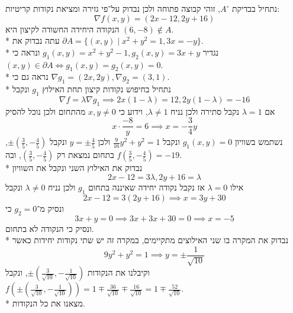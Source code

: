 נתחיל בבדיקת $A^\circ$, זוהי קבוצה פתוחה ולכן נבדוק על־פי גזירה ומציאת נקודות קריטיות:
\[
	\nabla f(x, y) = (2x - 12, 2y + 16)
\]
הנקודה היחידה החשודה לקיצון היא $(6, -8) \notin A$. \\*
עתה נבדוק את $\partial A = \{(x, y) \mid x^2 + y^2 = 1, 3x = -y \}$. \\*
נגדיר $g_1(x, y) = x^2 + y^2 - 1, g_2(x, y) = 3x + y$ ונראה כי $(x, y) \in \partial A \iff g_1(x, y) = g_2(x, y) = 0$. \\*
נראה גם כי $\nabla g_1 = (2x, 2y), \nabla g_2 = (3, 1)$. \\*
נתחיל בחיפוש נקודות קיצון תחת האילוץ $g_1$ ונקבל
\[
	\nabla f = \lambda \nabla g_1
	\implies
	2x (1 - \lambda) = 12, 2y (1 - \lambda) = -16
\]
אם $\lambda = 1$ נקבל סתירה ולכן נניח $\lambda \ne 1$, וידוע כי $x, y \ne 0$ מהתחום ולכן נוכל להסיק
\[
	x \cdot \frac{-8}{y} = 6 \implies x = -\frac{3}{4} y
\]
נשתמש בשוויון $g_1(x, y) = 0$ ונקבל $\frac{9}{16}y^2 + y^2 = 1$ ולכן $y = \pm \frac{4}{5}$ ונקבל $\pm(\frac{3}{5}, -\frac{4}{5})$, בתחום נמצאת רק $(\frac{3}{5}, -\frac{4}{5})$, ובה $f(\frac{3}{5}, -\frac{4}{5}) = -19$. \\*
נבדוק את האילוץ השני ונקבל את השוויון
\[
	2x - 12 = 3 \lambda, 2y + 16 = \lambda
\]
אילו $\lambda = 0$ אז נקבל נקודה יחידה שאיננה בתחום $g_1$ ולכן נניח $\lambda \ne 0$ ונקבל
\[
	2x - 12 = 3(2y + 16) \implies x = 3y + 30
\]
ונסיק מ־$g_2 = 0$ כי
\[
	3x + y = 0
	\implies 3x + 3x + 30 = 0
	\implies x = -5
\]
ונסיק כי הנקודה לא בתחום. \\*
נבדוק את המקרה בו שני האילוצים מתקיימים, במקרה זה יש שתי נקודות יחידות כאשר
\[
	9y^2 + y^2 = 1 \implies y = \pm \frac{1}{\sqrt{10}}
\]
וקיבלנו את הנקודות $\pm(\frac{3}{\sqrt{10}}, -\frac{1}{\sqrt{10}})$,
ונקבל $f(\pm(\frac{3}{\sqrt{10}}, -\frac{1}{\sqrt{10}})) = 1 \mp \frac{36}{\sqrt{10}} \mp \frac{16}{\sqrt{10}} = 1 \mp \frac{52}{\sqrt{10}}$. \\*
מצאנו את כל הנקודות.


